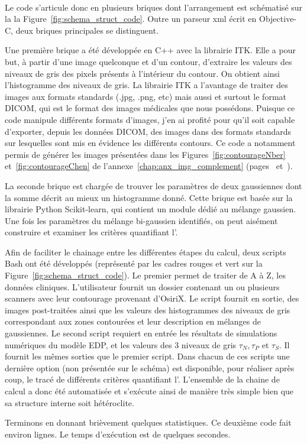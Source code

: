 \documentclass[main.tex]{subfiles}
\begin{document}
\paragraph{}
Le code s'articule donc en plusieurs briques dont l'arrangement est schématisé sur la la Figure~\ref{fig:schema_struct_code}. Outre un parseur xml écrit en Objective-C, deux briques principales se distinguent. 


Une première brique a été développée en C++ avec la librairie ITK. 
Elle a pour but, à partir d'une image quelconque 
 et d'un contour, d'extraire les valeurs des niveaux de gris des pixels présents à l'intérieur du contour. On obtient ainsi l'histogramme des niveaux de gris. 
La librairie ITK a l'avantage de traiter des images aux formats standards (.jpg, .png, etc) mais aussi et surtout le format DICOM, qui est le format des images médicales que nous possédons. 
Puisque ce code manipule différents formats d'images, j'en ai profité pour qu'il soit capable d'exporter, depuis les données DICOM, des images dans des formats standards sur lesquelles sont mis en évidence les différents contours. 
Ce code a notamment permis de générer les images présentées dans les Figures~\ref{fig:contourageNber} et~\ref{fig:contourageChen} de l'annexe~\ref{chap:anx_img_complement} (pages~\pageref{fig:contourageNber}  et~\pageref{fig:contourageNber}).


La seconde brique est chargée de trouver les paramètres de deux gaussiennes dont la somme décrit au mieux un histogramme donné. 
Cette brique est basée sur la librairie Python Scikit-learn, qui contient un module dédié au mélange gaussien. Une fois les paramètres du mélange bi-gaussien identifiés, on peut aisément construire et examiner les critères quantifiant l'\hetero.

Afin de faciliter le chainage entre les différentes étapes du calcul, deux scripts Bash ont été développés (représenté par les cadres rouges et vert sur la Figure~\ref{fig:schema_struct_code}). Le premier permet de traiter de A à Z, les données cliniques. L'utilisateur fournit un dossier contenant un ou plusieurs scanners avec leur contourage provenant d'OsiriX. Le script fournit en sortie, des images post-traitées ainsi que les valeurs des histogrammes des niveaux de gris correspondant aux zones contourées et leur description en mélanges de gaussiennes. Le second script requiert en entrée les résultats de simulations numériques du modèle EDP, et les valeurs des 3 niveaux de gris $\tau_N, \tau_P$ et $\tau_S$. Il fournit les mêmes sorties que le premier script. 
Dans chacun de ces scripts une dernière option (non présentée sur le schéma) est disponible, pour réaliser après coup, le tracé de différents critères quantifiant l'\hetero. 
L'ensemble de la chaine de calcul a donc été automatisée et s'exécute ainsi de manière très simple bien que sa structure interne soit hétéroclite. 


Terminons en donnant brièvement quelques statistiques. Ce deuxième code fait environ  lignes. Le temps d'exécution est de quelques secondes.
 
\end{document}
